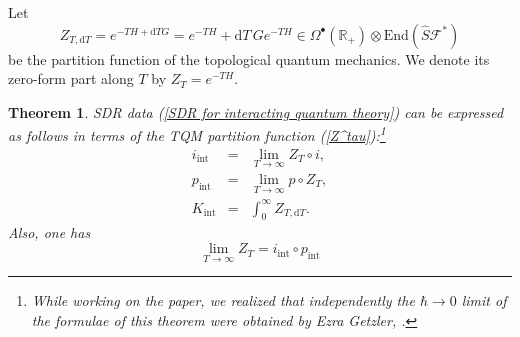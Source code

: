 \documentclass{amsart}
\theoremstyle{plain} %
\newtheorem{thm}{Theorem}[section]
\theoremstyle{definition}
\theoremstyle{remark}
\newcommand{\mr}{\mathrm}
\newcommand{\bt}{\bullet}
\newcommand{\ra}{\rightarrow}
\newcommand{\wh}{\widehat}
\newcommand{\F}{\mathcal{F}}
\newcommand{\RR}{\mathbb{R}}
\newcommand{\ii}{\mathrm{int}}
\newcommand{\dr}{\mathrm{d}}
\begin{document}
Let 
\begin{equation}\label{Z^tau}
    Z_{T,\dr T}=e^{-T H+\dr T G} = e^{-TH}+\dr T\, G e^{-TH}\in \Omega^\bt(\RR_+)\otimes \mr{End}(\wh{S}\F^*)
\end{equation}
be the partition function of the topological quantum mechanics. We denote its zero-form part along $T$ by $Z_T=e^{-TH}$.

\begin{thm}
\label{thm: interacting SDR via TQM}
    SDR data (\ref{SDR for interacting quantum theory}) can be expressed as follows in terms of the TQM partition function (\ref{Z^tau}):\footnote{
While working on the paper, we realized that independently the $\hbar\ra 0$ limit of the formulae of this theorem were obtained by Ezra Getzler, \cite{Getzler_talk}.
}
    \begin{eqnarray}
        i_\ii&=& \lim_{T\ra \infty} Z_T\circ i,\label{thm 5.3 i}\\
        p_\ii &=& \lim_{T\ra\infty} p\circ Z_T,\label{thm 5.3 p}\\
        K_\ii&=& \int_0^\infty Z_{T,\dr T}. \label{thm 5.3 K}
    \end{eqnarray}
    Also, one has
    \begin{equation}
        \lim_{T\ra\infty} Z_T = i_\ii\circ p_\ii \label{thm 5.3 Zinfty}
    \end{equation}
\end{thm}
\end{document}
